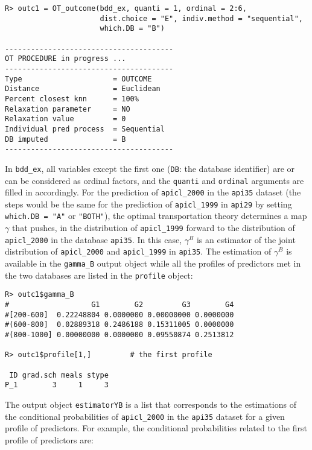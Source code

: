 \begin{verbatim}
R> outc1 = OT_outcome(bdd_ex, quanti = 1, ordinal = 2:6, 
                      dist.choice = "E", indiv.method = "sequential", 
                      which.DB = "B")

---------------------------------------
OT PROCEDURE in progress ...
---------------------------------------
Type                     = OUTCOME
Distance                 = Euclidean
Percent closest knn      = 100%
Relaxation parameter     = NO
Relaxation value         = 0
Individual pred process  = Sequential
DB imputed               = B
---------------------------------------
\end{verbatim}

In \texttt{bdd\_ex}, all variables except the first one (\texttt{DB}: the database identifier) are or can be considered as ordinal factors, and the \texttt{quanti} and \texttt{ordinal} arguments are filled in accordingly. For the prediction of \texttt{apicl\_2000} in the \texttt{api35} dataset (the steps would be the same for the prediction of \texttt{apicl\_1999} in \texttt{api29} by setting \texttt{which.DB\ =\ "A"} or \texttt{"BOTH"}), the optimal transportation theory determines a map \(\gamma\) that pushes, in the distribution of \texttt{apicl\_1999} forward to the distribution of \texttt{apicl\_2000} in the database \texttt{api35}. In this case, \(\gamma^B\) is an estimator of the joint distribution of \texttt{apicl\_2000} and \texttt{apicl\_1999} in \texttt{api35}. The estimation of \(\gamma^B\) is available in the \texttt{gamma\_B} output object while all the profiles of predictors met in the two databases are listed in the \texttt{profile} object:

\begin{verbatim}
R> outc1$gamma_B
#                   G1        G2         G3        G4
#[200-600]  0.22248804 0.0000000 0.00000000 0.0000000
#(600-800]  0.02889318 0.2486188 0.15311005 0.0000000
#(800-1000] 0.00000000 0.0000000 0.09550874 0.2513812

R> outc1$profile[1,]         # the first profile

 ID grad.sch meals stype
P_1        3     1     3
\end{verbatim}

The output object \texttt{estimatorYB} is a list that corresponds to the estimations of the conditional probabilities of \texttt{apicl\_2000} in the \texttt{api35} dataset for a given profile of predictors. For example, the conditional probabilities related to the first profile of predictors are:

